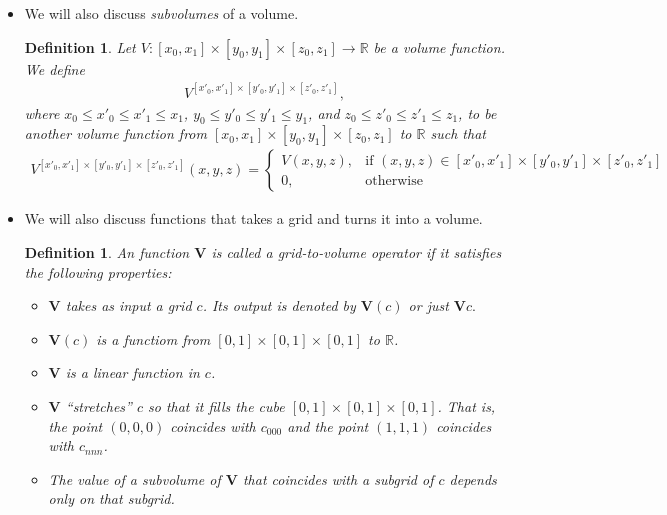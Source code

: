 \documentclass[10pt]{article}
\newtheorem{definition}[lemma]{Definition}
\newcommand{\V}{\mathbf{V}}
\begin{document}
\begin{itemize}
	\item We will also discuss \emph{subvolumes} of a volume.
	    \begin{definition}
	        Let $V: [x_0,x_1]\times[y_0,y_1] \times [z_0,z_1] 
	    \rightarrow \mathbb{R}$ be a volume function. We define
	    \begin{align*}
	        V^{[x'_0, x'_1] \times [y'_0,y'_1] \times [z'_0,z'_1]},
	    \end{align*}
	    where $x_0 \leq x'_0 \leq x'_1 \leq x_1$, 
	    $y_0 \leq y'_0 \leq y'_1 \leq y_1$,
	    and $z_0 \leq z'_0 \leq z'_1 \leq z_1$,
	    to be another volume function from 
	    $[x_0, x_1] \times [y_0, y_1] \times [z_0, z_1]$
	    to $\mathbb{R}$ such that
        \begin{align*}
            V^{[x'_0, x'_1] \times [y'_0,y'_1] \times [z'_0,z'_1]}(x,y,z) =
            \begin{cases}
                V(x,y,z), &\mbox{if }(x,y,z) \in 
                [x'_0, x'_1] \times [y'_0, y'_1] \times [z'_0, z'_1]\\
                0, &\mbox{otherwise}
            \end{cases}
        \end{align*}
        \end{definition}
		
    \item We will also discuss functions that takes a grid and turns
    it into a volume. 
    \begin{definition}
        An function $\V$ is called a \emph{grid-to-volume operator}
        if it satisfies the following properties:
        \begin{itemize}        
        \item $\V$ takes as input a grid $c$. Its output is
            denoted by $\V(c)$ or just $\V c.$
        \item $\V(c)$ is a functiom from 
            $[0,1] \times [0,1] \times [0,1]$
            to $\mathbb{R}$.
        \item $\V$ is a linear function in $c$.
        \item $\V$ ``stretches'' $c$ so that it fills         
        the cube $[0,1] \times [0,1] \times [0,1]$. That is, 
	    the point $(0,0,0)$ coincides with $c_{000}$ and 
	    the point $(1,1,1)$ coincides with $c_{nnn}$.
	    \item The value of a subvolume of $\V$ that coincides
	        with a subgrid of $c$ depends only on that subgrid.
	        

\end{itemize}
\end{definition}
\end{itemize}
\end{document}
